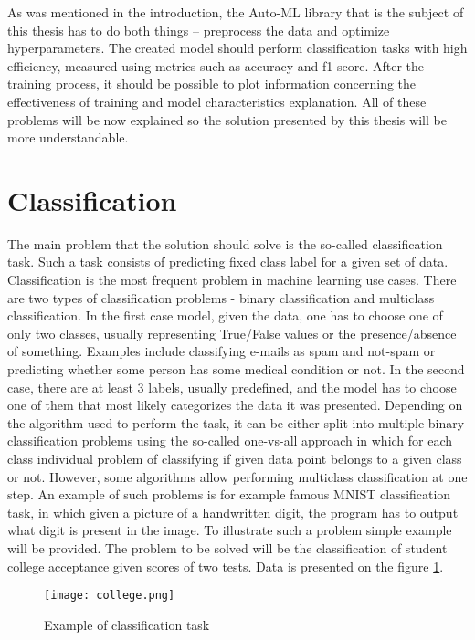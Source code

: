 \documentclass[a4paper,twoside,12pt]{book}
\begin{document}
As was mentioned in the introduction, the Auto-ML library that is the subject of this thesis has to do both things -- preprocess the data and optimize hyperparameters. The created model should perform classification tasks with high efficiency, measured using metrics such as accuracy and f1-score.
After the training process, it should be possible to plot information concerning the effectiveness of training and model characteristics explanation.
All of these problems will be now explained so the solution presented by this thesis will be more understandable.

\section{Classification}

The main problem that the solution should solve is the so-called classification task. Such a task consists of predicting fixed class label for a given set of data. Classification is the most frequent problem in machine learning use cases. There are two types of classification problems - binary classification and multiclass classification.
In the first case model, given the data, one has to choose one of only two classes, usually representing True/False values or the presence/absence of something. Examples include classifying e-mails as spam and not-spam or predicting whether some person has some medical condition or not.
In the second case, there are at least 3 labels, usually predefined, and the model has to choose one of them that most likely categorizes the data it was presented. Depending on the algorithm used to perform the task, it can be either split into multiple binary classification problems using the so-called one-vs-all approach in which for each class individual problem of classifying if given data point belongs to a given class or not. However, some algorithms allow performing multiclass classification at one step. An example of such problems is for example famous MNIST \cite{deng2012mnist} classification task, in which given a picture of a handwritten digit, the program has to output what digit is present in the image.
To illustrate such a problem simple example will be provided. The problem to be solved will be the classification of student college acceptance given scores of two tests. Data is presented on the figure \ref{fig:class_task}.


\begin{figure}[!htb]
    \centering
    \texttt{[image: college.png]}
    \caption{Example of classification task}
    \label{fig:class_task}
\end{figure}
\end{document}
